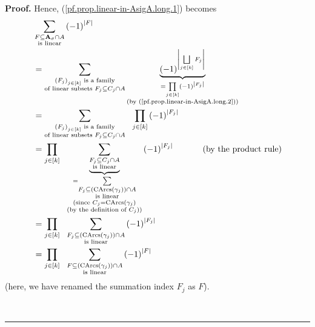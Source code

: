 \documentclass[numbers=enddot,12pt,final,onecolumn,notitlepage]{scrartcl}%
\numberwithin{exer}{section}
\theoremstyle{definition}
\newenvironment{proof}[1][Proof]{\noindent\textbf{#1.} }{\ \rule{0.5em}{0.5em}}
\let\sumnonlimits\sum
\let\prodnonlimits\prod
\let\sqcupnonlimits\bigsqcup
\renewcommand{\sum}{\sumnonlimits\limits}
\renewcommand{\prod}{\prodnonlimits\limits}
\renewcommand{\bigsqcup}{\sqcupnonlimits\limits}
\newenvironment{verlong}{}{}
\begin{document}
\begin{verlong}
\begin{proof}
Hence, (\ref{pf.prop.linear-in-AsigA.long.1}) becomes%
\begin{align}
&  \sum_{\substack{F\subseteq\mathbf{A}_{\sigma}\cap A\\\text{is linear}%
}}\left(  -1\right)  ^{\left\vert F\right\vert }\nonumber\\
&  =\sum_{\substack{\left(  F_{j}\right)  _{j\in\left[  k\right]  }\text{ is a
family}\\\text{of linear subsets }F_{j}\subseteq C_{j}\cap A}%
}\underbrace{\left(  -1\right)  ^{\left\vert \bigsqcup_{j\in\left[  k\right]
}F_{j}\right\vert }}_{\substack{=\prod_{j\in\left[  k\right]  }\left(
-1\right)  ^{\left\vert F_{j}\right\vert }\\\text{(by
(\ref{pf.prop.linear-in-AsigA.long.2}))}}}\nonumber\\
&  =\sum_{\substack{\left(  F_{j}\right)  _{j\in\left[  k\right]  }\text{ is a
family}\\\text{of linear subsets }F_{j}\subseteq C_{j}\cap A}}\ \ \prod
_{j\in\left[  k\right]  }\left(  -1\right)  ^{\left\vert F_{j}\right\vert
}\nonumber\\
&  =\prod_{j\in\left[  k\right]  }\ \ \underbrace{\sum_{\substack{F_{j}%
\subseteq C_{j}\cap A\\\text{is linear}}}}_{\substack{=\sum_{\substack{F_{j}%
\subseteq\left(  \operatorname*{CArcs}\left(  \gamma_{j}\right)  \right)  \cap
A\\\text{is linear}}}\\\text{(since }C_{j}=\operatorname*{CArcs}\left(
\gamma_{j}\right)  \\\text{(by the definition of }C_{j}\text{))}}}\left(
-1\right)  ^{\left\vert F_{j}\right\vert }\ \ \ \ \ \ \ \ \ \ \left(  \text{by
the product rule}\right) \nonumber\\
&  =\prod_{j\in\left[  k\right]  }\ \ \sum_{\substack{F_{j}\subseteq\left(
\operatorname*{CArcs}\left(  \gamma_{j}\right)  \right)  \cap A\\\text{is
linear}}}\left(  -1\right)  ^{\left\vert F_{j}\right\vert }\nonumber\\
&  =\prod_{j\in\left[  k\right]  }\ \ \sum_{\substack{F\subseteq\left(
\operatorname*{CArcs}\left(  \gamma_{j}\right)  \right)  \cap A\\\text{is
linear}}}\left(  -1\right)  ^{\left\vert F\right\vert }
\label{pf.prop.linear-in-AsigA.long.3}%
\end{align}
(here, we have renamed the summation index $F_{j}$ as $F$).


\end{proof}
\end{verlong}
\end{document}
